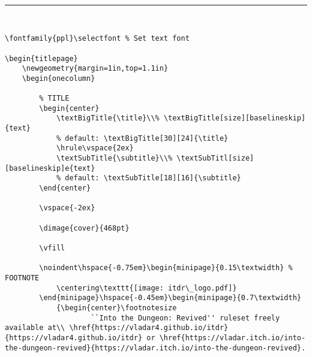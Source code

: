 \documentclass[10pt,twoside,twocolumn,openany]{book}
\begin{document}
\selectfont %

\begin{titlepage}
\begin{onecolumn}

\begin{center}
	\textBigTitle{\title}\\
	\hrule\vspace{2ex}
	\textSubTitle{\subtitle}\\
\end{center}

\vspace{-2ex}

\noindent\begin{minipage}{\linewidth}
\begin{lstlisting}
\fontfamily{ppl}\selectfont % Set text font

\begin{titlepage}
	\newgeometry{margin=1in,top=1.1in}
	\begin{onecolumn}
		
		% TITLE
		\begin{center}
			\textBigTitle{\title}\\% \textBigTitle[size][baselineskip]{text}
			% default: \textBigTitle[30][24]{\title}
			\hrule\vspace{2ex}
			\textSubTitle{\subtitle}\\% \textSubTitl[size][baselineskip]e{text}
			% default: \textSubTitle[18][16]{\subtitle}
		\end{center}
		
		\vspace{-2ex}
		
		\dimage{cover}{468pt}
		
		\vfill

		\noindent\hspace{-0.75em}\begin{minipage}{0.15\textwidth} % FOOTNOTE
			\centering\texttt{[image: itdr\_logo.pdf]}
		\end{minipage}\hspace{-0.45em}\begin{minipage}{0.7\textwidth}
			{\begin{center}\footnotesize
					``Into the Dungeon: Revived'' ruleset freely available at\\ \href{https://vladar4.github.io/itdr}{https://vladar4.github.io/itdr} or \href{https://vladar.itch.io/into-the-dungeon-revived}{https://vladar.itch.io/into-the-dungeon-revived}.
					

\end{lstlisting}
\end{minipage}
\end{onecolumn}
\end{titlepage}
\end{document}
